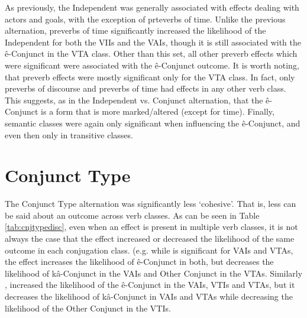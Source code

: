 As previously, the Independent was generally associated with effects dealing with actors and goals, with the exception of prteverbs of time. Unlike the previous alternation, preverbs of time significantly increased the likelihood of the Independent for both the VIIs and the VAIs, though it is still associated with the ê-Conjunct in the VTA class. Other than this set, all other preverb effects which were significant were associated with the ê-Conjunct outcome. It is worth noting, that preverb effects were mostly significant only for the VTA class. In fact, only preverbs of discourse and preverbs of time had effects in any other verb class. This suggests, as in the Independent vs. Conjunct alternation, that the ê-Conjunct is a form that is more marked/altered (except for time). Finally, semantic classes were again only significant when influencing the ê-Conjunct, and even then only in transitive classes. 


\FloatBarrier
\section{Conjunct Type}
The Conjunct Type alternation was significantly less `cohesive'. That is, less can be said about an outcome across verb classes. As can be seen in Table \ref{tab:cnjtypedisc}, even when an effect is present in multiple verb classes, it is not always the case that the effect increased or decreased the likelihood of the same outcome in each conjugation class. (e.g. while  is significant for VAIs and VTAs, the effect increases the likelihood of ê-Conjunct in both, but decreases the likelihood of kâ-Conjunct in the VAIs and Other Conjunct in the VTAs. Similarly , increased the likelihood of the ê-Conjunct in the VAIs, VTIs and VTAs, but it decreases the likelihood of kâ-Conjunct in VAIs and VTAs while decreasing the likelihood of the Other Conjunct in the VTIs.


